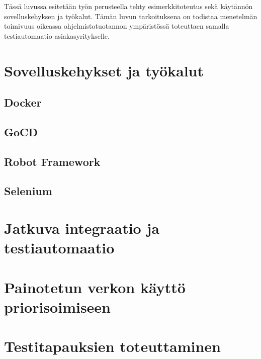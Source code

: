 Tässä luvussa esitetään työn perusteella tehty esimerkkitoteutus sekä käytännön sovelluskehyksen ja työkalut.
Tämän luvun tarkoituksena on todistaa menetelmän toimivuus oikeassa ohjelmistotuotannon ympäristössä toteuttaen samalla testiautomaatio asiakasyritykselle.

\section{Sovelluskehykset ja työkalut}


  \subsection{Docker}


  \subsection{GoCD}


  \subsection{Robot Framework}


  \subsection{Selenium}


\section{Jatkuva integraatio ja testiautomaatio}


\section{Painotetun verkon käyttö priorisoimiseen}


\section{Testitapauksien toteuttaminen}

